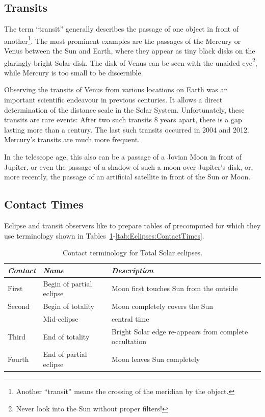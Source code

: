 \subsection{Transits}
\label{sec:Eclipses:Transits}

The term ``transit'' generally describes the passage of one object in
front of another\footnote{Another ``transit'' means the crossing of
  the meridian by the object.}. The most prominent examples are the
passages of the  Mercury or Venus between the Sun
and Earth, where they appear as tiny black disks on the glaringly
bright Solar disk. The disk of Venus can be seen with the unaided
eye\footnote{Never look into the Sun without proper filters!}, while
Mercury is too small to be discernible.

Observing the transits of Venus from various locations on Earth was an
important scientific endeavour in previous centuries. It allows a
direct determination of the distance scale in the Solar
System. Unfortunately, these transits are rare events: After two such
transits 8 years apart, there is a gap lasting more than a
century. The last such transits occurred in 2004 and 2012. Mercury's
transits are much more frequent.

In the telescope age, this also can be a passage of a Jovian Moon in
front of Jupiter, or even the passage of a shadow of such a moon over
Jupiter's disk, or, more recently, the passage of an artificial
satellite in front of the Sun or Moon.

\subsection{Contact Times}
\label{sec:Eclipses:ContactTimes}

Eclipse and transit observers like to prepare tables of precomputed
 for which they use terminology shown in
Tables~\ref{tab:Eclipses:ContactTimesSolar}-\ref{tab:Eclipses:ContactTimes}.

\begin{table}[p]
  \centering\small
  \begin{tabular}{lll}
\toprule
\emph{Contact} & \emph{Name}       & \emph{Description}\\\midrule
First   & Begin of partial eclipse & Moon first touches Sun from the outside\\  
Second  & Begin of totality        & Moon completely covers the Sun \\  
        & Mid-eclipse & central time\\
Third   & End of totality          & Bright Solar edge re-appears from complete occultation\\  
Fourth  & End of partial eclipse   & Moon leaves Sun completely \\  
\bottomrule
\end{tabular}
\caption{Contact terminology for Total Solar eclipses.}
\label{tab:Eclipses:ContactTimesSolar}
\end{table}

